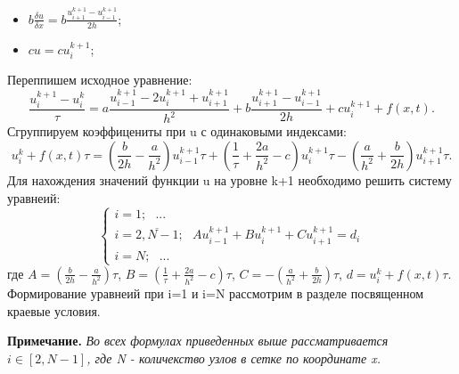\documentclass[12pt]{article}
\begin{document}
\begin{enumerate}
\begin{itemize}
            \item $b\frac{\delta u}{\delta x} = b\frac{u_{i+1}^{k+1}-u_{i-1}^{k+1}}{2h}$;
            \item $cu = cu_{i}^{k+1}$;
        \end{itemize}
        Переппишем исходное уравнение:
        $$\frac{u_i^{k+1}-u_i^{k}}{\tau} =a\frac{u_{i-1}^{k+1}-2u_{i}^{k+1}+u_{i+1}^{k+1}}{h^2}+b\frac{u_{i+1}^{k+1}-u_{i-1}^{k+1}}{2h}+cu_{i}^{k+1}+f(x,t).$$
        Сгруппируем коэффицениты при u с одинаковыми индексами:
        $$u_i^{k}+f(x,t)\tau = \left(\frac{b}{2h}-\frac{a}{h^2} \right)u_{i-1}^{k+1}\tau + \left(\frac{1}{\tau}+\frac{2a}{h^2}-c\right)u_i^{k+1}\tau -
        \left(\frac{a}{h^2}+\frac{b}{2h}\right)u_{i+1}^{k+1}\tau.$$
        Для нахождения значений функции u на уровне k+1 необходимо решить систему уравнеий:
        \begin{equation*}
            \begin{cases}
                i=1;\:\:\: ...
                \\
                i=\overline{2,N-1};\:\:\:Au_{i-1}^{k+1} + Bu_i^{k+1} +Cu_{i+1}^{k+1}=d_i
                \\
                i=N;\:\:\: ...
            \end{cases}
        \end{equation*}
        где $A = \left(\frac{b}{2h}-\frac{a}{h^2} \right)\tau$, $B = \left(\frac{1}{\tau}+\frac{2a}{h^2}-c\right)\tau$, $C = -\left(\frac{a}{h^2}+\frac{b}{2h}\right)\tau$, 
        $d = u_i^{k}+f(x,t)\tau$.\\
        Формирование уравнеий при i=1 и i=N рассмотрим в разделе посвященном краевые условия.
    \end{enumerate}
    \textbf{Примечание.}
    \emph{Во всех формулах приведенных выше рассматривается $i \in [2,N-1]$, где N - количекство узлов в сетке по координате x.}
\end{document}
